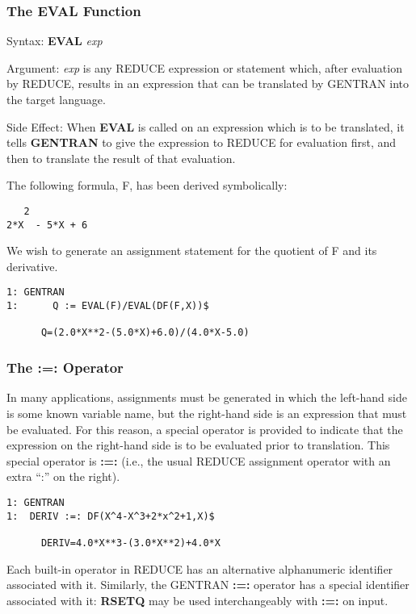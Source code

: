\subsubsection{The EVAL Function}
\label{eval}
\begin{describe}{Syntax:} 
{\bf EVAL} {\it exp}
\end{describe} 
\begin{describe}{Argument:}
{\it exp} is any REDUCE expression or statement which, after evaluation
by REDUCE, results in an expression that can be translated by
GENTRAN into the target language.
\end{describe}
\begin{describe}{Side Effect:}
When {\bf EVAL} is called on an expression which is to be translated, it
tells {\bf GENTRAN} to give the expression to REDUCE
for evaluation first, and then to translate the result of that evaluation.
\end{describe}
\begin{describe}{\example}
The following formula, F, has been derived symbolically:
\begin{verbatim}
   2
2*X  - 5*X + 6
\end{verbatim}
We wish to generate an assignment statement for the quotient
of F and its derivative.
\begin{verbatim}
1: GENTRAN 
1:      Q := EVAL(F)/EVAL(DF(F,X))$ 

      Q=(2.0*X**2-(5.0*X)+6.0)/(4.0*X-5.0)
\end{verbatim}
\end{describe}

\subsubsection{The :=: Operator}
\index{:=:}
\label{rsetq}  
In many applications, assignments must be generated in which the
left-hand side is some known variable name, but the
right-hand side is an expression that must be evaluated.  For
this reason, a special operator is provided to indicate that the expression
on the right-hand side is to be evaluated prior to translation.  This
special operator is {\bf :=:} (i.e., the usual REDUCE assignment operator
with an extra ``:'' on the right).
\begin{describe}{\example} 
\begin{verbatim}
1: GENTRAN 
1:  DERIV :=: DF(X^4-X^3+2*x^2+1,X)$ 

      DERIV=4.0*X**3-(3.0*X**2)+4.0*X
\end{verbatim}
\end{describe}
Each built-in operator in REDUCE has an alternative alphanumeric identifier
associated with it.  Similarly, the GENTRAN {\bf :=:} operator has a
special identifier associated with it: {\bf RSETQ} may be used 
interchangeably with {\bf :=:} on input.
